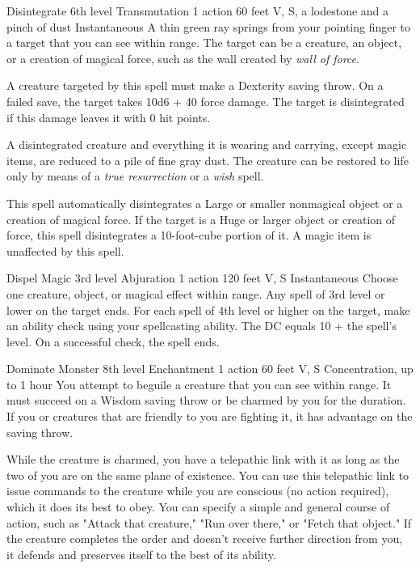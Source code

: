 \documentclass[10pt,a4paper,twoside,bg=print,twocolumn,openany,nodeprecatedcode]{dndbook}
\begin{document}
\DndSpellHeader%
{Disintegrate}
{6th level Transmutation}
{1 action}
{60 feet}
{V, S, a lodestone and a pinch of dust}
{Instantaneous}
A thin green ray springs from your pointing finger to a target that you can see within range. The target can be a creature, an object, or a creation of magical force, such as the wall created by \textit{wall of force}.

A creature targeted by this spell must make a Dexterity saving throw. On a failed save, the target takes 10d6 + 40 force damage. The target is disintegrated if this damage leaves it with 0 hit points.

A disintegrated creature and everything it is wearing and carrying, except magic items, are reduced to a pile of fine gray dust. The creature can be restored to life only by means of a \textit{true resurrection} or a \textit{wish} spell.

This spell automatically disintegrates a Large or smaller nonmagical object or a creation of magical force. If the target is a Huge or larger object or creation of force, this spell disintegrates a 10-foot-cube portion of it. A magic item is unaffected by this spell.



\DndSpellHeader%
{Dispel Magic}
{3rd level Abjuration}
{1 action}
{120 feet}
{V, S}
{Instantaneous}
Choose one creature, object, or magical effect within range. Any spell of 3rd level or lower on the target ends. For each spell of 4th level or higher on the target, make an ability check using your spellcasting ability. The DC equals 10 + the spell's level. On a successful check, the spell ends.



\DndSpellHeader%
{Dominate Monster}
{8th level Enchantment}
{1 action}
{60 feet}
{V, S}
{Concentration, up to 1 hour}
You attempt to beguile a creature that you can see within range. It must succeed on a Wisdom saving throw or be charmed by you for the duration. If you or creatures that are friendly to you are fighting it, it has advantage on the saving throw.

While the creature is charmed, you have a telepathic link with it as long as the two of you are on the same plane of existence. You can use this telepathic link to issue commands to the creature while you are conscious (no action required), which it does its best to obey. You can specify a simple and general course of action, such as "Attack that creature," "Run over there," or "Fetch that object." If the creature completes the order and doesn't receive further direction from you, it defends and preserves itself to the best of its ability.
\end{document}
